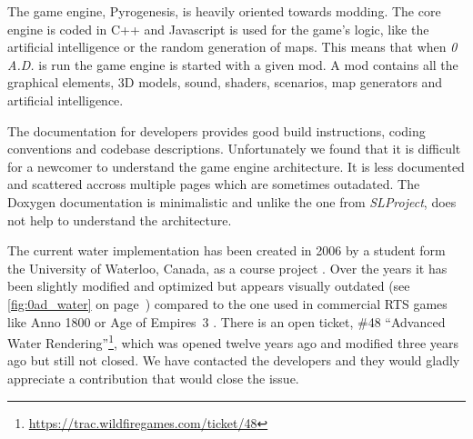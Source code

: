 The game engine, Pyrogenesis, is heavily oriented towards modding. The core
engine is coded in C++ and Javascript is used for the game's logic, like the
artificial intelligence or the random generation of maps. This means that when
\textit{0 A.D.} is run the game engine is started with a given mod. A mod
contains all the graphical elements, 3D models, sound, shaders, scenarios, map
generators and artificial intelligence.

The documentation for developers provides good build instructions, coding
conventions and codebase descriptions. Unfortunately we found that it is
difficult for a newcomer to understand the game engine architecture. It is less
documented and scattered accross multiple pages which are sometimes outadated.
The Doxygen documentation is minimalistic and unlike the one from
\textit{SLProject}, does not help to understand the architecture.

The current water implementation has been created in 2006 by a student form the
University of Waterloo, Canada, as a course project \autocite{zaharia2006cs}.
Over the years it has been slightly modified and optimized but appears visually
outdated (see \autoref{fig:0ad_water} on page~\pageref{fig:0ad_water}) compared
to the one used in commercial RTS games like Anno 1800 or Age of Empires~3
. There is an open ticket, \#48
``Advanced Water
Rendering''\footnote{\url{https://trac.wildfiregames.com/ticket/48}}, which was
opened twelve years ago and modified three years ago but still not closed.  We
have contacted the developers and they would gladly appreciate a contribution
that would close the issue.

